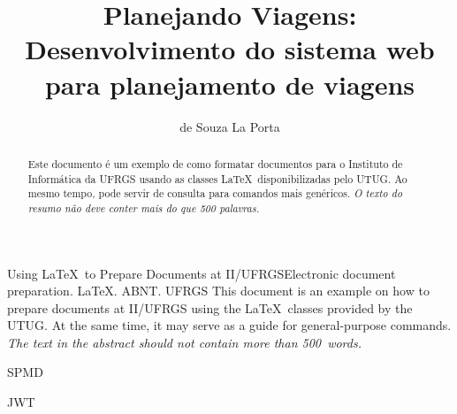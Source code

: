 \documentclass[cic,tc]{iiufrgs}
\title{Planejando Viagens: Desenvolvimento do sistema web para planejamento de viagens}
\author{de Souza La Porta}{Henrique}
\begin{document}
\maketitle





\begin{abstract}
    Este documento é um exemplo de como formatar documentos para o
    Instituto de Informática da UFRGS usando as classes \LaTeX\
    disponibilizadas pelo UTUG\@. Ao mesmo tempo, pode servir de consulta
    para comandos mais genéricos. \emph{O texto do resumo não deve
      conter mais do que 500 palavras.}
\end{abstract}

\begin{englishabstract}{Using \LaTeX\ to Prepare Documents at II/UFRGS}{Electronic document preparation. \LaTeX. ABNT. UFRGS}
    This document is an example on how to prepare documents at II/UFRGS
    using the \LaTeX\ classes provided by the UTUG\@. At the same time, it
    may serve as a guide for general-purpose commands. \emph{The text in
      the abstract should not contain more than 500~words.}
\end{englishabstract}

\listoffigures

\listoftables

\begin{listofabbrv}{SPMD}
    \item[JWT] 

\end{listofabbrv}
\end{document}
